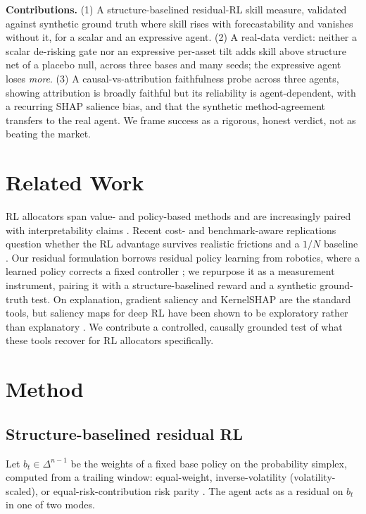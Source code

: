 \documentclass[sigconf,anonymous,review]{acmart}
\begin{document}
\noindent\textbf{Contributions.}
(1) A structure-baselined residual-RL skill measure, validated against synthetic
ground truth where skill rises with forecastability and vanishes without it, for a
scalar and an expressive agent.
(2) A real-data verdict: neither a scalar de-risking gate nor an expressive
per-asset tilt adds skill above structure net of a placebo null, across three bases
and many seeds; the expressive agent loses \emph{more}.
(3) A causal-vs-attribution faithfulness probe across three agents, showing
attribution is broadly faithful but its reliability is agent-dependent, with a
recurring SHAP salience bias, and that the synthetic method-agreement transfers to
the real agent. We frame success as a rigorous, honest verdict, not as beating the
market.

\section{Related Work}
RL allocators span value- and policy-based methods and are increasingly paired with
interpretability claims \cite{lavko2023,cong2021alphaportfolio,delarica2025}. Recent
cost- and benchmark-aware replications question whether the RL advantage survives
realistic frictions and a $1/N$ baseline \cite{kruthof2025,demiguel2009}. Our
residual formulation borrows residual policy learning from robotics, where a learned
policy corrects a fixed controller \cite{silver2018,johannink2019}; we repurpose it
as a measurement instrument, pairing it with a structure-baselined reward and a
synthetic ground-truth test. On explanation, gradient saliency \cite{simonyan2014}
and KernelSHAP \cite{lundberg2017} are the standard tools, but saliency maps for
deep RL have been shown to be exploratory rather than explanatory \cite{atrey2020}.
We contribute a controlled, causally grounded test of what these tools recover for
RL allocators specifically.

\section{Method}

\subsection{Structure-baselined residual RL}
Let $b_t \in \Delta^{n-1}$ be the weights of a fixed base policy on the probability
simplex, computed from a trailing window: equal-weight, inverse-volatility
(volatility-scaled), or equal-risk-contribution risk parity \cite{maillard2010}. The
agent acts as a residual on $b_t$ in one of two modes.
\end{document}

